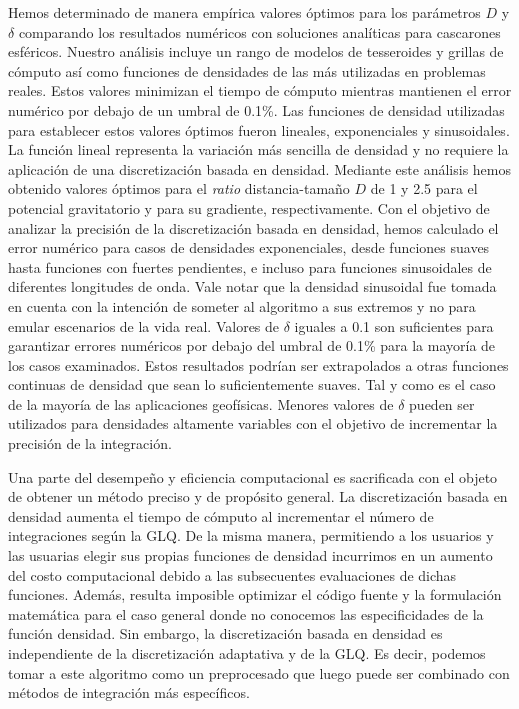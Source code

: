 Hemos determinado de manera empírica valores óptimos para los parámetros $D$
y $\delta$ comparando los resultados numéricos con soluciones analíticas para
cascarones esféricos.
Nuestro análisis incluye un rango de modelos de tesseroides y grillas de
cómputo así como funciones de densidades de las más utilizadas en problemas
reales.
Estos valores minimizan el tiempo de cómputo mientras mantienen el error
numérico por debajo de un umbral de 0.1\%.
Las funciones de densidad utilizadas para establecer estos valores óptimos
fueron lineales, exponenciales y sinusoidales.
La función lineal representa la variación más sencilla de densidad y no
requiere la aplicación de una discretización basada en densidad.
Mediante este análisis hemos obtenido valores óptimos para el \emph{ratio}
distancia-tamaño $D$ de 1 y 2.5 para el potencial gravitatorio y para su
gradiente, respectivamente.
Con el objetivo de analizar la precisión de la discretización basada en
densidad, hemos calculado el error numérico para casos de densidades
exponenciales, desde funciones suaves hasta funciones con fuertes pendientes,
e incluso para funciones sinusoidales de diferentes longitudes de onda.
Vale notar que la densidad sinusoidal fue tomada en cuenta con la intención de
someter al algoritmo a sus extremos y no para emular escenarios de la vida
real.
Valores de $\delta$ iguales a 0.1 son suficientes para garantizar errores
numéricos por debajo del umbral de 0.1\% para la mayoría de los casos
examinados.
Estos resultados podrían ser extrapolados a otras funciones continuas de
densidad que sean lo suficientemente suaves. Tal y como es el caso de la
mayoría de las aplicaciones geofísicas.
Menores valores de $\delta$ pueden ser utilizados para densidades altamente
variables con el objetivo de incrementar la precisión de la integración.

Una parte del desempeño y eficiencia computacional es sacrificada con el objeto
de obtener un método preciso y de propósito general.
La discretización basada en densidad aumenta el tiempo de cómputo al
incrementar el número de integraciones según la \ac{GLQ}.
De la misma manera, permitiendo a los usuarios y las usuarias elegir sus
propias funciones de densidad incurrimos en un aumento del costo computacional
debido a las subsecuentes evaluaciones de dichas funciones.
Además, resulta imposible optimizar el código fuente y la formulación
matemática para el caso general donde no conocemos las especificidades de la
función densidad.
Sin embargo, la discretización basada en densidad es independiente de la
discretización adaptativa y de la \ac{GLQ}.
Es decir, podemos tomar a este algoritmo como un preprocesado que luego puede
ser combinado con métodos de integración más específicos.

